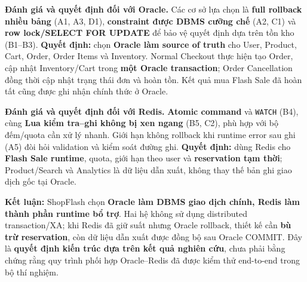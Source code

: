\textbf{Đánh giá và quyết định đối với Oracle.} Các cơ sở lựa chọn là \textbf{full rollback nhiều bảng} (A1, A3, D1), \textbf{constraint được DBMS cưỡng chế} (A2, C1) và \textbf{row lock/SELECT FOR UPDATE} để bảo vệ quyết định dựa trên tồn kho (B1–B3). \textbf{Quyết định:} chọn \textbf{Oracle làm source of truth} cho User, Product, Cart, Order, Order Items và Inventory. Normal Checkout thực hiện tạo Order, cập nhật Inventory/Cart trong \textbf{một Oracle transaction}; Order Cancellation đồng thời cập nhật trạng thái đơn và hoàn tồn. Kết quả mua Flash Sale đã hoàn tất cũng được ghi nhận chính thức ở Oracle.

\textbf{Đánh giá và quyết định đối với Redis.} \textbf{Atomic command} và \texttt{WATCH} (B4), cùng \textbf{Lua kiểm tra–ghi không bị xen ngang} (B5, C2), phù hợp với bộ đếm/quota cần xử lý nhanh. Giới hạn không rollback khi runtime error sau ghi (A5) đòi hỏi validation và kiểm soát đường ghi. \textbf{Quyết định:} dùng Redis cho \textbf{Flash Sale runtime}, quota, giới hạn theo user và \textbf{reservation tạm thời}; Product/Search và Analytics là dữ liệu dẫn xuất, không thay thế bản ghi giao dịch gốc tại Oracle.

\textbf{Kết luận:} ShopFlash chọn \textbf{Oracle làm DBMS giao dịch chính, Redis làm thành phần runtime bổ trợ}. Hai hệ không sử dụng distributed transaction/XA; khi Redis đã giữ suất nhưng Oracle rollback, thiết kế cần \textbf{bù trừ reservation}, còn dữ liệu dẫn xuất được đồng bộ sau Oracle COMMIT. Đây là \textbf{quyết định kiến trúc dựa trên kết quả nghiên cứu}, chưa phải bằng chứng rằng quy trình phối hợp Oracle–Redis đã được kiểm thử end-to-end trong bộ thí nghiệm.
